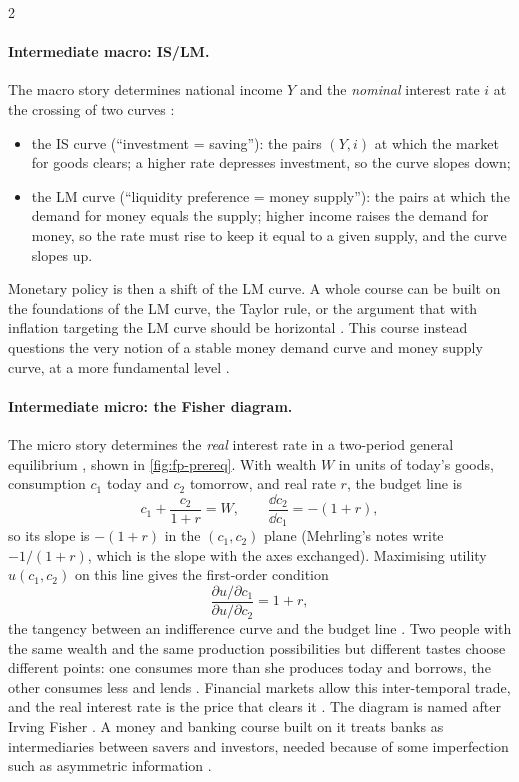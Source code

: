 \begin{paracol}{2}
\paragraph{Intermediate macro: IS/LM.} The macro story determines national income $Y$ and the
\emph{nominal} interest rate $i$ at the crossing of two curves :
\begin{itemize}
  \item the IS curve (``investment = saving''): the pairs $(Y,i)$ at which the market for goods clears;
        a higher rate depresses investment, so the curve slopes down;
  \item the LM curve (``liquidity preference = money supply''): the pairs at which the demand for money
        equals the supply; higher income raises the demand for money, so the rate must rise to keep it
        equal to a given supply, and the curve slopes up.
\end{itemize}
Monetary policy is then a shift of the LM curve. A whole course can be built on the foundations of the LM
curve, the Taylor rule, or the argument that with inflation targeting the LM curve should be horizontal
. This course instead questions the very notion of a stable money demand curve and money supply
curve, at a more fundamental level .

\paragraph{Intermediate micro: the Fisher diagram.} The micro story determines the \emph{real} interest rate in a
two-period general equilibrium , shown in \cref{fig:fp-prereq}. With wealth $W$ in units of
today's goods, consumption $c_1$ today and $c_2$ tomorrow, and real rate $r$, the budget line is
\begin{equation}\label{eq:fp-budget}
  c_1 + \frac{c_2}{1+r} = W, \qquad \frac{\dd c_2}{\dd c_1} = -(1+r),
\end{equation}
so its slope is $-(1+r)$ in the $(c_1,c_2)$ plane (Mehrling's notes write $-1/(1+r)$, which is the slope with
the axes exchanged). Maximising utility $u(c_1,c_2)$ on this line gives the first-order condition
\[
  \frac{\partial u/\partial c_1}{\partial u/\partial c_2} = 1+r,
\]
the tangency between an indifference curve and the budget line . Two people with the same
wealth and the same production possibilities but different tastes choose different points: one consumes more
than she produces today and borrows, the other consumes less and lends . Financial markets allow
this inter-temporal trade, and the real interest rate is the price that clears it . The diagram
is named after Irving Fisher . A money and banking course built on it treats banks as
intermediaries between savers and investors, needed because of some imperfection such as asymmetric
information .


\end{paracol}
